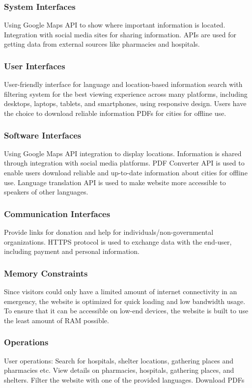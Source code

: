 \documentclass[12pt]{report}
\begin{document}
\subsubsection*{System Interfaces}
Using Google Maps API to show where important information is located. Integration with
social media sites for sharing information. APIs are used for getting data from external 
sources like pharmacies and hospitals.

\subsubsection*{User Interfaces}
User-friendly interface for language and location-based information search with filtering system
for the best viewing experience across many platforms, including desktops, laptops, tablets, and
smartphones, using responsive design. Users have the choice to download reliable information PDFs
for cities for offline use.

\subsubsection*{Software Interfaces}
Using Google Maps API integration to display locations. Information is shared through integration
with social media platforms. PDF Converter API is used to enable users download reliable and up-to-date
information about cities for offline use. Language translation API is used to make website more accessible to 
speakers of other languages.

\subsubsection*{Communication Interfaces}
Provide links for donation and help for individuals/non-governmental organizations. HTTPS protocol 
is used to exchange data with the end-user, including payment and personal information.

\subsubsection*{Memory Constraints}
Since visitors could only have a limited amount of internet connectivity in an emergency, the
website is optimized for quick loading and low bandwidth usage. To ensure that it can be accessible
on low-end devices, the website is built to use the least amount of RAM possible.

\subsubsection*{Operations}
User operations: Search for hospitals, shelter locations, gathering places and pharmacies etc.
View details on pharmacies, hospitals, gathering places, and shelters. Filter the website with one of
the provided languages. Download PDFs
\end{document}
